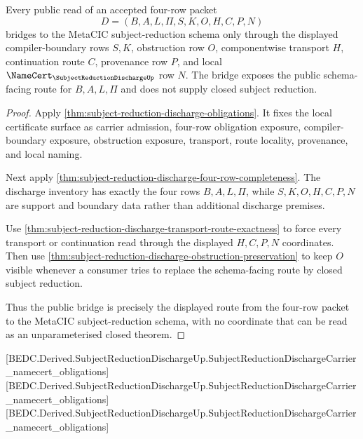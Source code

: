 \begin{theorem}
\label{thm:subject-reduction-discharge-schema-bridge}
Every public read of an accepted four-row packet
$$
D=(B,A,L,\Pi,S,K,O,H,C,P,N)
$$
bridges to the MetaCIC subject-reduction schema only through the displayed compiler-boundary rows $S,K$, obstruction row $O$, componentwise transport $H$, continuation route $C$, provenance row $P$, and local $\NameCert_{\SubjectReductionDischargeUp}$ row $N$. The bridge exposes the public schema-facing route for $B,A,L,\Pi$ and does not supply closed subject reduction.
\end{theorem}
\begin{proof}
Apply \autoref{thm:subject-reduction-discharge-obligations}. It fixes the local certificate surface as carrier admission, four-row obligation exposure, compiler-boundary exposure, obstruction exposure, transport, route locality, provenance, and local naming.

Next apply \autoref{thm:subject-reduction-discharge-four-row-completeness}. The discharge inventory has exactly the four rows $B,A,L,\Pi$, while $S,K,O,H,C,P,N$ are support and boundary data rather than additional discharge premises.

Use \autoref{thm:subject-reduction-discharge-transport-route-exactness} to force every transport or continuation read through the displayed $H,C,P,N$ coordinates. Then use \autoref{thm:subject-reduction-discharge-obstruction-preservation} to keep $O$ visible whenever a consumer tries to replace the schema-facing route by closed subject reduction.

Thus the public bridge is precisely the displayed route from the four-row packet to the MetaCIC subject-reduction schema, with no coordinate that can be read as an unparameterised closed theorem.
\end{proof}

[BEDC.Derived.SubjectReductionDischargeUp.SubjectReductionDischargeCarrier\_namecert\_obligations]
[BEDC.Derived.SubjectReductionDischargeUp.SubjectReductionDischargeCarrier\_namecert\_obligations]
[BEDC.Derived.SubjectReductionDischargeUp.SubjectReductionDischargeCarrier\_namecert\_obligations]

